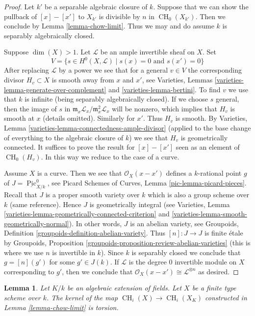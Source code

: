 \documentclass[10pt,a4paper]{amsart}
\theoremstyle{plain}
\newtheorem{lemma}[subsection]{Lemma}
\theoremstyle{definition}
\theoremstyle{remark}
\numberwithin{equation}{subsection}
\def\CH{\mathop{\mathrm{CH}}\nolimits}
\def\Pic{\mathop{\mathrm{Pic}}\nolimits}
\begin{document}
\begin{proof}
Let $k'$ be a separable algebraic closure of $k$. Suppose that we can show
the pullback of $[x] - [x']$ to $X_{k'}$ is divisible by $n$ in
$\CH_0(X_{k'})$. Then we conclude by Lemma \ref{lemma-chow-limit}.
Thus we may and do assume $k$ is separably algebraically closed.

\medskip\noindent
Suppose $\dim(X) > 1$. Let $\mathcal{L}$ be an ample invertible sheaf on $X$.
Set
$$
V = \{s \in H^0(X, \mathcal{L}) \mid s(x) = 0\text{ and }s(x') = 0 \}
$$
After replacing $\mathcal{L}$ by a power we see that for
a general $v \in V$ the corresponding divisor $H_v \subset X$ is smooth
away from $x$ and $x'$, see
Varieties, Lemmas \ref{varieties-lemma-generate-over-complement} and
\ref{varieties-lemma-bertini}. To find $v$ we use that $k$ is infinite (being
separably algebraically closed).
If we choose $s$ general, then the image of $s$ in
$\mathfrak m_x\mathcal{L}_x/\mathfrak m_x^2\mathcal{L}_x$
will be nonzero, which implies that $H_v$ is smooth at $x$
(details omitted). Similarly for $x'$. Thus $H_v$ is smooth.
By Varieties, Lemma \ref{varieties-lemma-connectedness-ample-divisor}
(applied to the base change of everything
to the algebraic closure of $k$)
we see that $H_v$ is geometrically connected.
It suffices to prove the result for
$[x] - [x']$ seen as an element of $\CH_0(H_v)$.
In this way we reduce to the case of a curve.

\medskip\noindent
Assume $X$ is a curve. Then we see that $\mathcal{O}_X(x - x')$
defines a $k$-rational point $g$ of $J = \underline{\Pic}^0_{X/k}$, see
Picard Schemes of Curves, Lemma \ref{pic-lemma-picard-pieces}.
Recall that $J$ is a proper smooth variety over $k$
which is also a group scheme over $k$ (same reference).
Hence $J$ is geometrically integral
(see Varieties, Lemma \ref{varieties-lemma-geometrically-connected-criterion}
and \ref{varieties-lemma-smooth-geometrically-normal}).
In other words, $J$ is an abelian variety, see
Groupoids, Definition \ref{groupoids-definition-abelian-variety}.
Thus $[n] : J \to J$ is finite \'etale by
Groupoids, Proposition \ref{groupoids-proposition-review-abelian-varieties}
(this is where we use $n$ is invertible in $k$).
Since $k$ is separably closed we conclude that $g = [n](g')$
for some $g' \in J(k)$. If $\mathcal{L}$ is the degree $0$
invertible module on $X$ corresponding to $g'$, then we conclude
that $\mathcal{O}_X(x - x') \cong \mathcal{L}^{\otimes n}$ as desired.
\end{proof}

\begin{lemma}
\label{lemma-kernel-to-closure}
Let $K/k$ be an algebraic extension of fields.
Let $X$ be a finite type scheme over $k$.
The kernel of the map $\CH_i(X) \to \CH_i(X_K)$
constructed in Lemma \ref{lemma-chow-limit}
is torsion.
\end{lemma}
\end{document}
